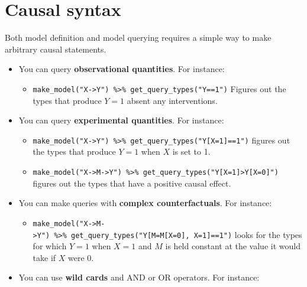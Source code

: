 \documentclass[
  12pt,
]{book}
\providecommand{\tightlist}{%
  \setlength{\itemsep}{0pt}\setlength{\parskip}{0pt}}
\begin{document}
\hypertarget{syntax}{%
\section{Causal syntax}\label{syntax}}

Both model definition and model querying requires a simple way to make arbitrary causal statements.

\begin{itemize}
\tightlist
\item
  You can query \textbf{observational quantities}. For instance:

  \begin{itemize}
  \tightlist
  \item
    \texttt{make\_model("X-\textgreater{}Y")\ \%\textgreater{}\%\ get\_query\_types("Y==1")} Figures out the types that produce \(Y=1\) absent any interventions.
  \end{itemize}
\item
  You can query \textbf{experimental quantities}. For instance:

  \begin{itemize}
  \tightlist
  \item
    \texttt{make\_model("X-\textgreater{}Y")\ \%\textgreater{}\%\ get\_query\_types("Y{[}X=1{]}==1")} figures out the types that produce \(Y=1\) when \(X\) is set to 1.
  \item
    \texttt{make\_model("X-\textgreater{}M-\textgreater{}Y")\ \%\textgreater{}\%\ get\_query\_types("Y{[}X=1{]}\textgreater{}Y{[}X=0{]}")} figures out the types that have a positive causal effect.
  \end{itemize}
\item
  You can make queries with \textbf{complex counterfactuals}. For instance:

  \begin{itemize}
  \tightlist
  \item
    \texttt{make\_model("X-\textgreater{}M-\textgreater{}Y")\ \%\textgreater{}\%\ get\_query\_types("Y{[}M=M{[}X=0{]},\ X=1{]}==1")} looks for the types for which \(Y=1\) when \(X=1\) and \(M\) is held constant at the value it would take if \(X\) were 0.
  \end{itemize}
\item
  You can use \textbf{wild cards} and AND or OR operators. For instance:


\end{itemize}
\end{document}

